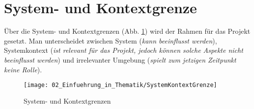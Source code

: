 \section{System- und Kontextgrenze} \label{SystemKontextGrenze}

Über die System- und Kontextgrenzen (Abb. \ref{fig:SystemKontextGrenze}) wird der Rahmen für das Projekt gesetzt. Man unterscheidet zwischen System (\textit{kann beeinflusst werden}), Systemkontext (\textit{ist relevant für das Projekt, jedoch können solche Aspekte nicht beeinflusst werden}) und irrelevanter Umgebung (\textit{spielt zum jetzigen Zeitpunkt keine Rolle}).

\begin{figure}[h!]
	\centering
	\texttt{[image: 02\_Einfuehrung\_in\_Thematik/SystemKontextGrenze]}
	\captionsetup{justification=centering}
	\caption{System- und Kontextgrenzen}
	\label{fig:SystemKontextGrenze}
\end{figure}

\newpage